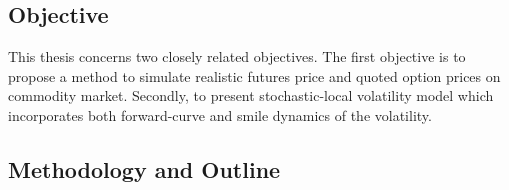 \subsection{Objective}
This thesis concerns two closely related objectives. The first objective is to propose a method to simulate realistic futures price and quoted option prices on commodity market. Secondly, to present stochastic-local volatility model which incorporates both forward-curve and smile dynamics of the volatility. 







\subsection{Methodology and Outline}


 










